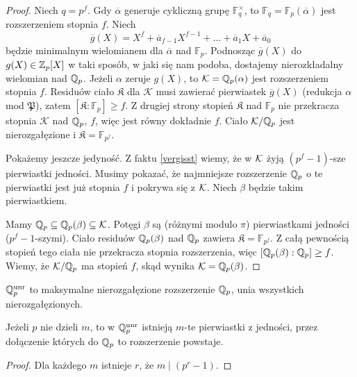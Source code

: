 \begin{proof}
	Niech $q = p^f$.
	Gdy $\overline \alpha$ generuje cykliczną grupę $\mathbb F ^\times_q$, to $\mathbb F_q = \mathbb F_p(\overline \alpha)$ jest rozszerzeniem stopnia $f$.
	Niech
	\[
		\overline g(X) = X^f + \overline{a}_{f-1} X^{f-1} + \ldots + \overline{a}_1 X + \overline{a}_0
	\]
	będzie minimalnym wielomianem dla $\overline \alpha$ nad $\mathbb F_p$.
	Podnosząc $\overline g(X)$ do $g(X) \in \mathbb Z_p[X]$ w taki sposób, w jaki się nam podoba, dostajemy nierozkładalny wielomian nad $\mathbb Q_p$.
	Jeżeli $\alpha$ zeruje $g(X)$, to $\mathcal K = \mathbb Q_p(\alpha)$ jest rozszerzeniem stopnia $f$.
	Residuów ciało $\mathfrak K$ dla $\mathcal K$ musi zawierać pierwiastek $\overline g(X)$ (redukcja $\alpha$ mod $\mathfrak P$), zatem $[\mathfrak K : \mathbb F_p] \ge f$.
	Z drugiej strony stopień $\mathfrak K$ nad $\mathbb F_p$ nie przekracza stopnia $\mathcal K$ nad $\mathbb Q_p$, $f$, więc jest równy dokładnie $f$.
	Ciało $\mathcal K / \mathbb Q_p$ jest nierozgałęzione i $\mathfrak K = \mathbb F_{p^f}$.

	Pokażemy jeszcze jedyność.
	Z faktu \ref{vergisst} wiemy, że w $\mathcal K$ żyją $(p^f-1)$-sze pierwiastki jedności.
	Musimy pokazać, że najmniejsze rozszerzenie $\mathbb Q_p$ o te pierwiastki jest już stopnia $f$ i pokrywa się z $\mathcal K$.
	Niech $\beta$ będzie takim pierwiastkiem.

	Mamy $\mathbb Q_p \subseteq \mathbb Q_p(\beta) \subseteq \mathcal K$.
	Potęgi $\beta$ są (różnymi modulo $\pi$) pierwiastkami jedności ($p^f-1$-szymi).
	Ciało residuów $\mathbb Q_p(\beta)$ nad $\mathbb Q_p$ zawiera $\mathfrak K = \mathbb F_{p^f}$.
	Z całą pewnością stopień tego ciała nie przekracza stopnia rozszerzenia, więc $[\mathbb Q_p(\beta) : \mathbb Q_p] \ge f$.
	Wiemy, że $\mathcal K / \mathbb Q_p$ ma stopień $f$, skąd wynika $\mathcal K = \mathbb Q_p(\beta)$.
\end{proof}

\begin{definicja}
	$\mathbb Q_p^{\textrm{unr}}$ to maksymalne nierozgałęzione rozszerzenie $\mathbb Q_p$, unia wszystkich nierozgałęzionych.
\end{definicja}

\begin{fakt}
	Jeżeli $p$ nie dzieli $m$, to w $\mathbb Q_p^{\textrm{unr}}$ istnieją $m$-te pierwiastki z jedności, przez dołączenie których do $\mathbb Q_p$ to rozszerzenie powstaje.
\end{fakt}

\begin{proof}
	Dla każdego $m$ istnieje $r$, że $m \mid (p^r - 1)$.
\end{proof}


